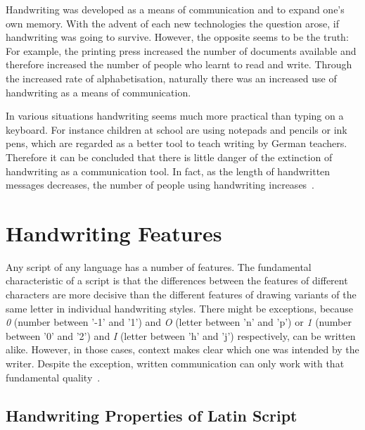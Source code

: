 Handwriting was developed as a means of communication and to expand one's own
memory. With the advent of each new technologies the question arose, 
if handwriting was going to survive. However, the opposite seems to be the 
truth: For example, the printing press increased the number of documents
available and therefore increased the number of people who learnt to read
and write. Through the increased rate of alphabetisation, naturally there was
an increased use of handwriting as a means of communication.

In various situations handwriting seems much more practical than typing on a
keyboard. For instance children at school are using notepads and pencils or
ink pens, which are regarded as a better tool to teach writing by German 
teachers. Therefore it can be concluded that there is little danger of
the extinction of handwriting as a communication tool. In fact, as 
the length of handwritten messages decreases, the number of people using 
handwriting increases~.

\section{Handwriting Features}
\label{sec:handwritingfeatures}

Any script of any language has a number of features. The fundamental 
characteristic of a script is that the differences between the features
of different characters are more decisive than the different features of 
drawing variants of the same letter in individual handwriting styles.
There might be exceptions, because \emph{0} (number between '-1' and '1') and 
\emph{O} (letter between 'n' and 'p') or \emph{1} (number between '0' and '2') 
and \emph{I} (letter between 'h' and 'j') respectively, can be written alike. 
However, in those cases, context makes clear which one was intended by the 
writer. Despite the exception, written communication can only work with that
fundamental quality~.

\subsection{Handwriting Properties of Latin Script}
\label{sec:handwritingpropertieslatin}

